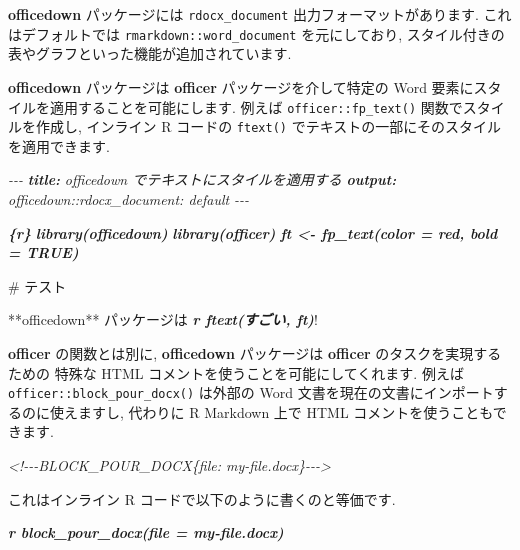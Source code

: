 \documentclass[
  11pt,
]{bxjsreport}
\newenvironment{Shaded}{\begin{snugshade}}{\end{snugshade}}
\newcommand{\AnnotationTok}[1]{\textcolor[rgb]{0.56,0.35,0.01}{\textbf{\textit{#1}}}}
\newcommand{\CommentTok}[1]{\textcolor[rgb]{0.56,0.35,0.01}{\textit{#1}}}
\newcommand{\FunctionTok}[1]{\textcolor[rgb]{0.00,0.00,0.00}{#1}}
\newcommand{\InformationTok}[1]{\textcolor[rgb]{0.56,0.35,0.01}{\textbf{\textit{#1}}}}
\newcommand{\NormalTok}[1]{#1}
\begin{document}
\textbf{officedown} パッケージには \texttt{rdocx\_document} 出力フォーマットがあります. これはデフォルトでは \texttt{rmarkdown::word\_document} を元にしており, スタイル付きの表やグラフといった機能が追加されています.

\textbf{officedown} パッケージは \textbf{officer} パッケージを介して特定の Word 要素にスタイルを適用することを可能にします. 例えば \texttt{officer::fp\_text()} 関数でスタイルを作成し, インライン R コードの \texttt{ftext()} でテキストの一部にそのスタイルを適用できます.

\begin{Shaded}
\begin{Highlighting}[]
\CommentTok{{-}{-}{-}}
\AnnotationTok{title:}\CommentTok{ officedown でテキストにスタイルを適用する}
\AnnotationTok{output:}
\CommentTok{  officedown::rdocx\_document: default}
\CommentTok{{-}{-}{-}}

\InformationTok{\textasciigrave{}\textasciigrave{}\textasciigrave{}\{r\}}
\InformationTok{library(officedown)}
\InformationTok{library(officer)}
\InformationTok{ft \textless{}{-} fp\_text(color = \textquotesingle{}red\textquotesingle{}, bold = TRUE)}
\InformationTok{\textasciigrave{}\textasciigrave{}\textasciigrave{}}

\FunctionTok{\# テスト}

\NormalTok{**officedown** パッケージは }\InformationTok{\textasciigrave{}r ftext(\textquotesingle{}すごい\textquotesingle{}, ft)\textasciigrave{}}\NormalTok{!}
\end{Highlighting}
\end{Shaded}

\textbf{officer} の関数とは別に, \textbf{officedown} パッケージは \textbf{officer} のタスクを実現するための 特殊な HTML コメントを使うことを可能にしてくれます. 例えば \texttt{officer::block\_pour\_docx()} は外部の Word 文書を現在の文書にインポートするのに使えますし, 代わりに R Markdown 上で HTML コメントを使うこともできます.

\begin{Shaded}
\begin{Highlighting}[]
\CommentTok{\textless{}!{-}{-}{-}BLOCK\_POUR\_DOCX\{file: \textquotesingle{}my{-}file.docx\textquotesingle{}\}{-}{-}{-}\textgreater{}}
\end{Highlighting}
\end{Shaded}

これはインライン R コードで以下のように書くのと等価です.

\begin{Shaded}
\begin{Highlighting}[]
\InformationTok{\textasciigrave{}r block\_pour\_docx(file = \textquotesingle{}my{-}file.docx\textquotesingle{})\textasciigrave{}}
\end{Highlighting}
\end{Shaded}
\end{document}
